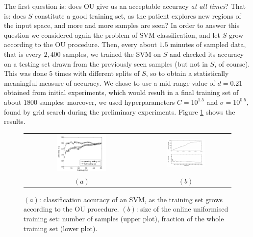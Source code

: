 The first question is: does OU give us an acceptable accuracy \emph{at
all times}? That is: does $S$ constitute a good training set, as the
patient explores new regions of the input space, and more and more
samples are seen? In order to answer this question we considered again
the problem of SVM classification, and let $S$ grow according to the
OU procedure. Then, every about $1.5$ minutes of sampled data, that is
every $2,400$ samples, we trained the SVM on $S$ and checked its
accuracy on a testing set drawn from the previously seen samples (but
not in $S$, of course). This was done $5$ times with different splits
of $S$, so to obtain a statistically meaningful measure of
accuracy. We chose to use a mid-range value of $d = 0.21$ obtained
from initial experiments, which would result in a final training set
of about $1800$ samples; moreover, we used hyperparameters $C =
10^{1.5}$ and $\sigma = 10^{0.5}$, found by grid search during the
preliminary experiments. Figure \ref{fig:inc} shows the results.

\begin{figure}[!ht] \centering
  \begin{tabular}{cc}
    \includegraphics[width=0.45\textwidth]{figs/fig_resInc_OU21.png} &
    \includegraphics[width=0.45\textwidth]{figs/fig_growth_OU21.png} \\
    $(a)$ & $(b)$ \\
  \end{tabular}
  \caption{$(a)$: classification accuracy of an SVM, as the training set
    grows according to the OU procedure. $(b)$:
    size of the online uniformised training set: number of samples
    (upper plot), fraction of the whole training set (lower plot).}
  \label{fig:inc}
\end{figure}

